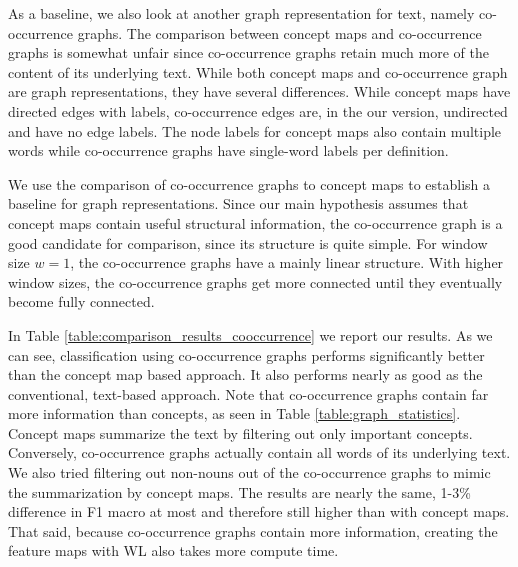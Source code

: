
As a baseline, we also look at another graph representation for text, namely co-occurrence graphs.
The comparison between concept maps and co-occurrence graphs is somewhat unfair since co-occurrence graphs retain much more of the content of its underlying text.
While both concept maps and co-occurrence graph are graph representations, they have several differences. While concept maps have directed edges with labels, co-occurrence edges are, in the our version, undirected and have no edge labels.
The node labels for concept maps also contain multiple words while co-occurrence graphs have single-word labels per definition.

We use the comparison of co-occurrence graphs to concept maps to establish a baseline for graph representations.
Since our main hypothesis assumes that concept maps contain useful structural information, the co-occurrence graph is a good candidate for comparison, since its structure is quite simple.
For window size $w=1$, the co-occurrence graphs have a mainly linear structure. With higher window sizes, the co-occurrence graphs get more connected until they eventually become fully connected.

In Table \ref{table:comparison_results_cooccurrence} we report our results.
As we can see, classification using co-occurrence graphs performs significantly better than the concept map based approach.
It also performs nearly as good as the conventional, text-based approach.
Note that co-occurrence graphs contain far more information than concepts, as seen in Table \ref{table:graph_statistics}.
Concept maps summarize the text by filtering out only important concepts.
Conversely, co-occurrence graphs actually contain all words of its underlying text.
We also tried filtering out non-nouns out of the co-occurrence graphs to mimic the summarization by concept maps. 
The results are nearly the same, 1-3\% difference in F1 macro at most and therefore still higher than with concept maps.
That said, because co-occurrence graphs contain more information, creating the feature maps with WL also takes more compute time.

